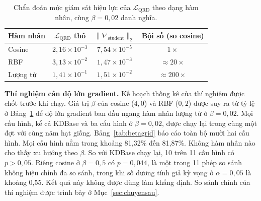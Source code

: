 \begin{table}[!htbp]
\centering
\caption{Chẩn đoán mức giám sát hiệu lực của $\mathcal{L}_{\mathrm{QRD}}$
theo dạng hàm nhân, cùng $\beta = 0{,}02$ danh nghĩa.}
\label{tab:betafair}
\begin{tabular}{lccc}
\toprule
\textbf{Hàm nhân} & $\mathcal{L}_{\mathrm{QRD}}$ \textbf{thô} & $\|\nabla_{\mathrm{student}}\|_2$ & \textbf{Bội số (so cosine)} \\
\midrule
Cosine  & $2{,}16 \times 10^{-3}$ & $7{,}54 \times 10^{-5}$ & $1\times$ \\
RBF     & $3{,}13 \times 10^{-2}$ & $1{,}47 \times 10^{-3}$ & $\approx 20\times$ \\
Lượng tử & $1{,}41 \times 10^{-1}$ & $1{,}51 \times 10^{-2}$ & $\approx 200\times$ \\
\bottomrule
\end{tabular}
\end{table}
\FloatBarrier

\textbf{Thí nghiệm cân độ lớn gradient.} Kế hoạch thống kê của thí nghiệm
được chốt trước khi chạy. Giá trị $\beta$ của cosine ($4{,}0$) và RBF
($0{,}2$) được suy ra từ tỷ lệ ở Bảng~\ref{tab:betafair} để độ lớn gradient
ban đầu ngang hàm nhân lượng tử ở $\beta = 0{,}02$. Mọi cấu hình, kể cả
KDBase và ba cấu hình ở $\beta = 0{,}02$, được chạy lại trong cùng một đợt
với cùng năm hạt giống. Bảng~\ref{tab:betagrid} báo cáo toàn bộ mười hai cấu
hình. Mọi cấu hình nằm trong khoảng 81,32\% đến 81,87\%. Không hàm nhân nào
cho thấy xu hướng theo $\beta$. So với KDBase chạy lại, 10 trên 11 cấu hình có
$p > 0{,}05$. Riêng cosine ở $\beta = 0{,}5$ có $p = 0{,}044$, là một trong 11
phép so sánh không hiệu chỉnh đa so sánh, trong khi số dương tính giả kỳ vọng
ở $\alpha = 0{,}05$ là khoảng 0,55. Kết quả này không được dùng làm khẳng định.
So sánh chính của thí nghiệm được trình bày ở Mục~\ref{sec:chuyensau}.

